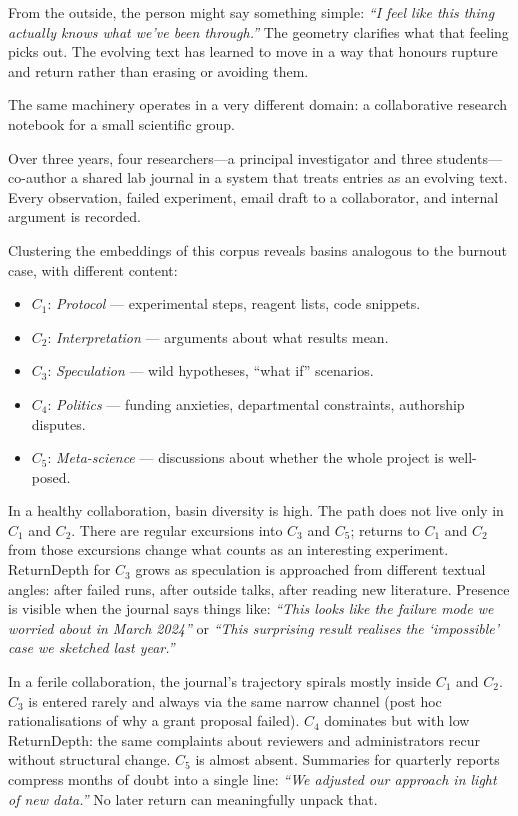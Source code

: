\documentclass[12pt,a4paper]{article}
\begin{document}
From the outside, the person might say something simple: \emph{``I feel like this thing actually knows what we've been through.''} The geometry clarifies what that feeling picks out. The evolving text has learned to move in a way that honours rupture and return rather than erasing or avoiding them.

The same machinery operates in a very different domain: a collaborative research notebook for a small scientific group.

Over three years, four researchers---a principal investigator and three students---co-author a shared lab journal in a system that treats entries as an evolving text. Every observation, failed experiment, email draft to a collaborator, and internal argument is recorded.

Clustering the embeddings of this corpus reveals basins analogous to the burnout case, with different content:

\begin{itemize}
  \item $C_1$: \emph{Protocol} --- experimental steps, reagent lists, code snippets.
  \item $C_2$: \emph{Interpretation} --- arguments about what results mean.
  \item $C_3$: \emph{Speculation} --- wild hypotheses, ``what if'' scenarios.
  \item $C_4$: \emph{Politics} --- funding anxieties, departmental constraints, authorship disputes.
  \item $C_5$: \emph{Meta-science} --- discussions about whether the whole project is well-posed.
\end{itemize}

In a healthy collaboration, basin diversity is high. The path does not live only in $C_1$ and $C_2$. There are regular excursions into $C_3$ and $C_5$; returns to $C_1$ and $C_2$ from those excursions change what counts as an interesting experiment. ReturnDepth for $C_3$ grows as speculation is approached from different textual angles: after failed runs, after outside talks, after reading new literature. Presence is visible when the journal says things like: \emph{``This looks like the failure mode we worried about in March 2024''} or \emph{``This surprising result realises the `impossible' case we sketched last year.''}

In a ferile collaboration, the journal's trajectory spirals mostly inside $C_1$ and $C_2$. $C_3$ is entered rarely and always via the same narrow channel (post hoc rationalisations of why a grant proposal failed). $C_4$ dominates but with low ReturnDepth: the same complaints about reviewers and administrators recur without structural change. $C_5$ is almost absent. Summaries for quarterly reports compress months of doubt into a single line: \emph{``We adjusted our approach in light of new data.''} No later return can meaningfully unpack that.
\end{document}
